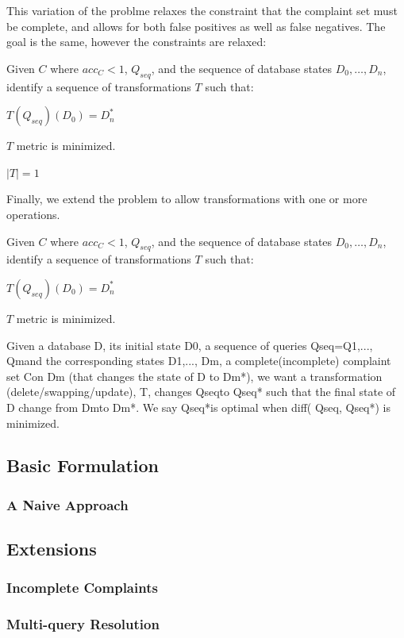 This variation of the problme relaxes the constraint that the complaint set must be complete, and allows
for both false positives as well as false negatives.  The goal is the same, however the constraints are relaxed:

\begin{problem}\label{prob:incomplete}
Given $C$ where $acc_C < 1$, $Q_{seq}$, and the sequence of database states $D_0,\ldots,D_n$, 
identify a sequence of transformations $T$ such that:
\begin{CompactItemize}
\item $T(Q_{seq})(D_0) = D^*_n$
\item $T$ metric is minimized.
\item $|T| = 1$
\end{CompactItemize}
\end{problem}

Finally, we extend the problem to allow transformations with one or more operations.

\begin{problem}\label{prob:multi}
Given $C$ where $acc_C < 1$, $Q_{seq}$, and the sequence of database states $D_0,\ldots,D_n$, 
identify a sequence of transformations $T$ such that:
\begin{CompactItemize}
\item $T(Q_{seq})(D_0) = D^*_n$
\item $T$ metric is minimized.
\end{CompactItemize}
\end{problem}



 Given a database D, its initial
state D0, a sequence of queries Qseq={Q1,..., Qm}and the corresponding
states {D1,..., Dm}, a complete(incomplete) complaint set  Con Dm
(that changes the state of D to Dm*), we want a transformation
(delete/swapping/update), T, changes Qseqto Qseq* such that the
final state of D change from Dmto Dm*. We say  Qseq*is optimal when
diff( Qseq, Qseq*) is minimized.


\subsection{Basic Formulation}


\subsubsection{A Naive Approach}


\subsection{Extensions}

\subsubsection{Incomplete Complaints}

\subsubsection{Multi-query Resolution}


